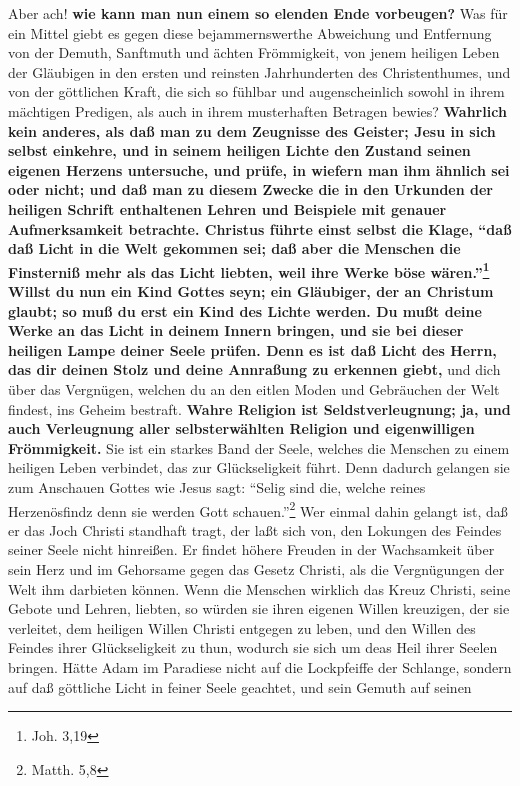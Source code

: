 Aber ach! \textbf{wie kann man nun einem so elenden Ende vorbeugen?} Was für ein Mittel
giebt es gegen diese bejammernswerthe Abweichung und Entfernung von der Demuth,
Sanftmuth und ächten Frömmigkeit, von jenem heiligen Leben der Gläubigen in den
ersten und reinsten Jahrhunderten des Christenthumes, und von der göttlichen
Kraft, die sich so fühlbar und augenscheinlich sowohl in ihrem mächtigen
Predigen, als auch in ihrem musterhaften Betragen bewies? \textbf{Wahrlich kein anderes,
als daß man zu dem Zeugnisse des Geister; Jesu in sich selbst einkehre, und in
seinem heiligen Lichte den Zustand seinen eigenen Herzens untersuche, und prüfe,
in wiefern man ihm ähnlich sei oder nicht; und daß man zu diesem Zwecke die in
den Urkunden der heiligen Schrift enthaltenen Lehren und Beispiele mit genauer
Aufmerksamkeit betrachte. Christus führte einst selbst die Klage, "`daß daß
Licht in die Welt gekommen sei; daß aber die Menschen die Finsterniß mehr als
das Licht liebten, weil ihre Werke böse wären."'\footnote{Joh. 3,19} Willst du
nun ein Kind Gottes seyn; ein Gläubiger, der an Christum glaubt; so muß du erst
ein Kind des Lichte werden. Du mußt deine Werke an das Licht in deinem Innern
bringen, und sie bei dieser heiligen Lampe deiner Seele prüfen. Denn es ist daß
Licht des Herrn, das dir deinen Stolz und deine Annraßung zu erkennen giebt,} und
dich über das Vergnügen, welchen du an den eitlen Moden und Gebräuchen der Welt
findest, ins Geheim bestraft. \textbf{Wahre Religion ist Seldstverleugnung; ja, und auch
Verleugnung aller selbsterwählten Religion und eigenwilligen Frömmigkeit.} Sie
ist ein starkes Band der Seele, welches die Menschen zu einem heiligen Leben
verbindet, das zur Glückseligkeit führt. Denn dadurch gelangen sie zum Anschauen
Gottes wie Jesus sagt: "`Selig sind die, welche reines Herzenösfindz denn sie
werden Gott schauen."'\footnote{Matth. 5,8} Wer einmal dahin gelangt ist, daß er
das Joch Christi standhaft tragt, der laßt sich von, den Lokungen des Feindes
seiner Seele nicht hinreißen. Er findet höhere Freuden in der Wachsamkeit über
sein Herz und im Gehorsame gegen das Gesetz Christi, als die Vergnügungen der
Welt ihm darbieten können. Wenn die Menschen wirklich das Kreuz Christi, seine
Gebote und Lehren, liebten, so würden sie ihren eigenen Willen kreuzigen, der
sie verleitet, dem heiligen Willen Christi entgegen zu leben, und den Willen des
Feindes ihrer Glückseligkeit zu thun, wodurch sie sich um deas Heil ihrer Seelen
bringen. Hätte Adam im Paradiese nicht auf die Lockpfeiffe der Schlange, sondern
auf daß göttliche Licht in feiner Seele geachtet, und sein Gemuth auf seinen
